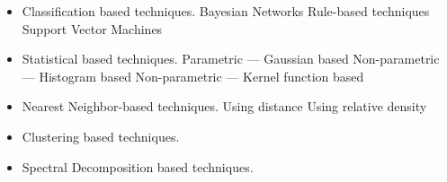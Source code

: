 

\begin{itemize}
	\setlength\itemsep{-0.5em}
	\item Classification based techniques.
	\subitem Bayesian Networks
	\subitem Rule-based techniques
	\subitem Support Vector Machines
	
	\item Statistical based techniques.
	\subitem Parametric --- Gaussian based
	\subitem Non-parametric --- Histogram based
	\subitem Non-parametric --- Kernel function based
	
	\item Nearest Neighbor-based techniques.
	\subitem Using distance
	\subitem Using relative density
	
	\item Clustering based techniques.
	
	\item Spectral Decomposition based techniques.
	
\end{itemize}


